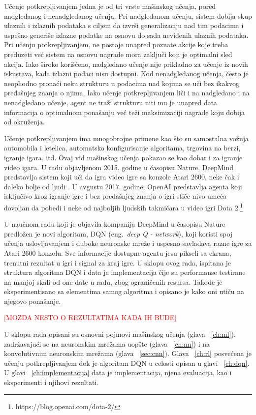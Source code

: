 Učenje potkrepljivanjem jedna je od tri vrste mašinskog učenja, pored nadgledanog i nenadgledanog učenja. Pri nadgledanom učenju, sistem dobija skup ulaznih i izlaznih podataka s ciljem da izvrši generalizaciju nad tim podacima i uspešno generiše izlazne podatke na osnovu do sada neviđenih ulaznih podataka. Pri učenju potkrepljivanjem, ne postoje unapred poznate akcije koje treba preduzeti već sistem na osnovu nagrade mora zaključi koji je optimalni sled akcija. Iako široko korišćeno, nadgledano učenje nije prikladno za učenje iz novih iskustava, kada izlazni podaci nisu dostupni.  Kod nenadgledanog učenja, često je neophodno pronaći neku strukturu u podacima nad kojima se uči bez ikakvog pređašnjeg znanja o njima. Iako učenje potkrepljivanjem liči i na nadgledano i na nenadgledano učenje, agent ne traži strukturu niti mu je unapred data informacija o optimalnom ponašanju već teži maksimizaciji nagrade koju dobija od okruženja. \par


Učenje potkrepljivanjem ima mnogobrojne primene kao što su samostalna vožnja automobila i letelica, automatsko konfigurisanje algoritama, trgovina na berzi, igranje igara, itd. Ovaj vid mašinskog učenja pokazao se kao dobar i za igranje video igara.  U radu objavljenom 2015. godine u časopisu Nature, DeepMind predstavlja sistem koji uči da igra video igre sa konzole Atari 2600, neke čak i daleko bolje od ljudi \cite{dqn_dm}. U avgustu 2017. godine, OpenAI predstavlja agenta koji isključivo kroz igranje igre i bez pređašnjeg znanja o igri stiče nivo umeća dovoljan da pobedi i neke od najboljih ljudskih takmičara u video igri Dota 2.\footnote{https://blog.openai.com/dota-2/} 

U naučnom radu koji je objavila kompanija DeepMind u časopisu Nature predložen je novi algoritam, DQN (eng.~{\em deep Q - network}), koji koristi spoj učenja uslovljavanjem i duboke neuronske mreže i uspesno savladava razne igre za Atari 2600 konzolu. Sve informacije dostupne agentu jesu pikseli sa ekrana, trenutni rezultat u igri i signal za kraj igre.
U sklopu ovog rada, ispitana je struktura algoritma DQN i data je implementacija čije su performanse testirane na manjoj skali od one date u radu, zbog ograničenih resursa. Takođe je eksperimentisano sa elementima samog algoritma i opisano je kako oni utiču na njegovo ponašanje.


\textcolor{red}{[MOZDA NESTO O REZULTATIMA KADA IH BUDE]}


U sklopu rada opisani su osnovni pojmovi mašinskog učenja (glava ~\ref{ch:ml}), zadržavajući se na neuronskim mrežama uopšte (glava ~\ref{ch:nn}) i na konvolutivnim neuronskim mrežama (glava ~\ref{sec:cnn}). Glava ~\ref{ch:rl} posvećena je učenju potkrepljivanjem dok je algoritam DQN u celosti opisan u glavi ~\ref{ch:dqn}. U glavi ~\ref{ch:implementacija} data je implementacija, njena evaluacija, kao i eksperimenti i njihovi rezultati.
